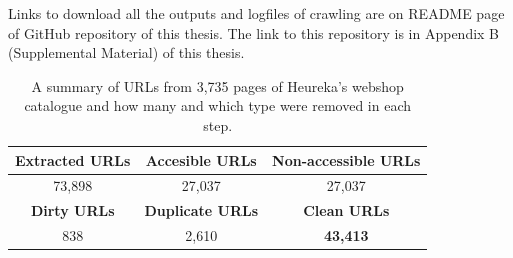 Links to download all the outputs and logfiles of crawling are on README page of GitHub repository of this thesis. The link to this repository is in Appendix B (Supplemental Material) of this thesis.

\begin{table}[h!]
    \bgroup
    \def\arraystretch{1.65}
    \centering
    \begin{tabular}{ c | c | c } 
        \toprule
        \textbf{Extracted URLs} & \textbf{Accesible URLs} & \textbf{Non-accessible URLs} \\ \hline
        73,898 & 27,037 & 27,037 \\ \hline
        \textbf{Dirty URLs} & \textbf{Duplicate URLs} & \textbf{ Clean URLs} \\ \hline
        838 & 2,610 & \textbf{43,413}
    \end{tabular}
    \egroup
    \caption{A summary of URLs from 3,735 pages of Heureka's webshop catalogue and how many and which type were removed in each step.}
    \label{table:summary-corpus-creation}
\end{table}